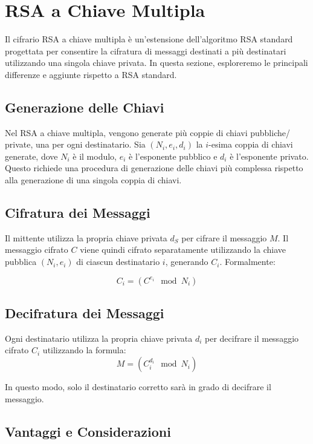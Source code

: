\documentclass[a4paper,12pt]{report}
\begin{document}
\section{RSA a Chiave Multipla}

Il cifrario RSA a chiave multipla è un'estensione dell'algoritmo RSA standard progettata per consentire la cifratura di messaggi destinati a più destinatari utilizzando una singola chiave privata. In questa sezione, esploreremo le principali differenze e aggiunte rispetto a RSA standard.

\subsection{Generazione delle Chiavi}

Nel RSA a chiave multipla, vengono generate più coppie di chiavi pubbliche/ private, una per ogni destinatario. Sia \( (N_i, e_i, d_i) \) la \( i \)-esima coppia di chiavi generate, dove \( N_i \) è il modulo, \( e_i \) è l'esponente pubblico e \( d_i \) è l'esponente privato. Questo richiede una procedura di generazione delle chiavi più complessa rispetto alla generazione di una singola coppia di chiavi.

\subsection{Cifratura dei Messaggi}

Il mittente utilizza la propria chiave privata \( d_S \) per cifrare il messaggio \( M \). Il messaggio cifrato \( C \) viene quindi cifrato separatamente utilizzando la chiave pubblica \( (N_i, e_i) \) di ciascun destinatario \( i \), generando \( C_i \). Formalmente:

\[C_i = (C^{e_i} \mod N_i)\]

\subsection{Decifratura dei Messaggi}

Ogni destinatario utilizza la propria chiave privata \( d_i \) per decifrare il messaggio cifrato \( C_i \) utilizzando la formula:
\[M = (C_i^{d_i} \mod N_i)\]

In questo modo, solo il destinatario corretto sarà in grado di decifrare il messaggio.

\subsection{Vantaggi e Considerazioni}
\end{document}
